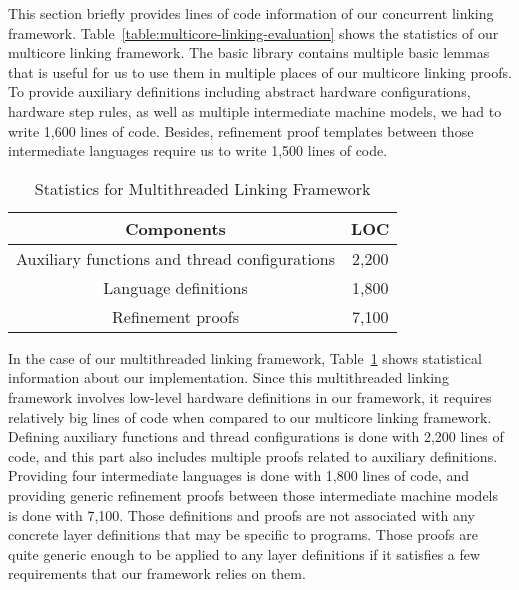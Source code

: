 This section briefly provides lines of code information of our concurrent linking framework. 
Table~\ref{table:multicore-linking-evaluation} shows the statistics of our multicore linking framework. 
The basic library contains multiple basic lemmas that is useful for us to use them in multiple places of our multicore linking proofs. 
To provide auxiliary definitions including abstract hardware configurations, hardware step rules, as well as multiple intermediate machine models, we had to write 1,600 lines of code.
Besides, refinement proof templates between those intermediate languages require us to write 1,500 lines of code.
\begin{table}
\begin{center}
\renewcommand{\arraystretch}{1.1}
\setlength{\tabcolsep}{0.3em}
\begin{tabular}{|c|c|}
\hline
Components  & LOC\\
\hline
\hline
Auxiliary functions and thread configurations & 2,200 \\
\hline
Language definitions & 1,800 \\
\hline
Refinement proofs & 7,100 \\
\hline
\end{tabular}
\end{center}
\caption{Statistics for Multithreaded Linking Framework}
\label{table:multithreaded-linking-evaluation}
\hrulefill
\end{table}
In the case of our multithreaded linking framework, Table~\ref{table:multithreaded-linking-evaluation} shows statistical information about our implementation. 
Since this multithreaded linking framework involves low-level hardware definitions in our framework, it requires relatively big lines of code when compared to our multicore linking framework. 
Defining auxiliary functions and thread configurations is done with 2,200 lines of code, and this part also includes multiple proofs related to auxiliary definitions. 
Providing four intermediate languages is done with   1,800 lines of code, and providing generic refinement proofs between those intermediate machine models is done with 7,100. 
Those definitions and proofs are not associated with any concrete layer definitions that may be specific to programs. 
Those proofs are quite generic enough to be applied to any layer definitions if it satisfies a few requirements that our framework relies on them.


